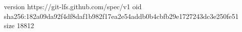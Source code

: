 version https://git-lfs.github.com/spec/v1
oid sha256:182a09da92f4df8daf1b982f17ea2e54addb0b4cbfb29e1727243dc3e250fe51
size 18812
